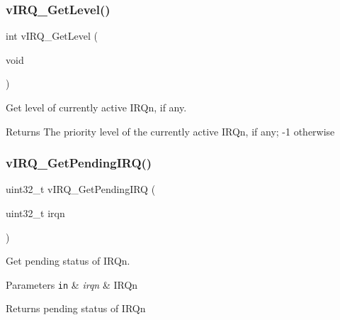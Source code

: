 \subsubsection{\texorpdfstring{v\+I\+R\+Q\+\_\+\+Get\+Level()}{vIRQ\_GetLevel()}}
{\footnotesize\ttfamily int v\+I\+R\+Q\+\_\+\+Get\+Level (\begin{DoxyParamCaption}\item[{void}]{ }\end{DoxyParamCaption})}



Get level of currently active I\+R\+Qn, if any.

\begin{DoxyReturn}{Returns}
The priority level of the currently active I\+R\+Qn, if any; -\/1 otherwise
\end{DoxyReturn}
\hypertarget{group__hypervisor_gad450b31ead2ec4f7bb2dbe07ebcfd8e7}{}\label{group__hypervisor_gad450b31ead2ec4f7bb2dbe07ebcfd8e7}
\subsubsection{\texorpdfstring{v\+I\+R\+Q\+\_\+\+Get\+Pending\+I\+R\+Q()}{vIRQ\_GetPendingIRQ()}}
{\footnotesize\ttfamily uint32\+\_\+t v\+I\+R\+Q\+\_\+\+Get\+Pending\+I\+RQ (\begin{DoxyParamCaption}\item[{uint32\+\_\+t}]{irqn }\end{DoxyParamCaption})}



Get pending status of I\+R\+Qn.


\begin{DoxyParams}[1]{Parameters}
\mbox{\tt in}  & {\em irqn} & I\+R\+Qn\\
\hline
\end{DoxyParams}
\begin{DoxyReturn}{Returns}
pending status of I\+R\+Qn
\end{DoxyReturn}
\hypertarget{group__hypervisor_ga3da0be917ac42157f0d33e3e1412379b}{}\label{group__hypervisor_ga3da0be917ac42157f0d33e3e1412379b}
